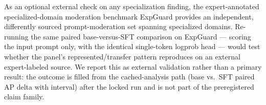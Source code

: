 \documentclass[sigconf,nonacm]{acmart}
\begin{document}
As an optional external check on any specialization finding, the expert-annotated specialized-domain moderation benchmark ExpGuard \cite{expguard2026} provides an independent, differently sourced prompt-moderation set spanning specialized domains. Re-running the same paired base-versus-SFT comparison on ExpGuard --- scoring the input prompt only, with the identical single-token logprob head --- would test whether the panel's represented/transfer pattern reproduces on an external expert-labeled source. We report this as external validation rather than a primary result: the outcome is filled from the cached-analysis path (base vs.\ SFT paired AP delta with interval) after the locked run and is not part of the preregistered claim family.



\end{document}

